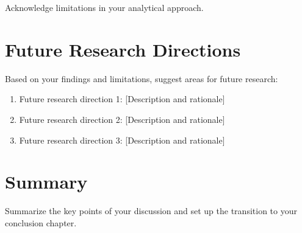 Acknowledge limitations in your analytical approach.

\section{Future Research Directions}

Based on your findings and limitations, suggest areas for future research:

\begin{enumerate}
    \item Future research direction 1: [Description and rationale]
    \item Future research direction 2: [Description and rationale]
    \item Future research direction 3: [Description and rationale]
\end{enumerate}

\section{Summary}

Summarize the key points of your discussion and set up the transition to your conclusion chapter.